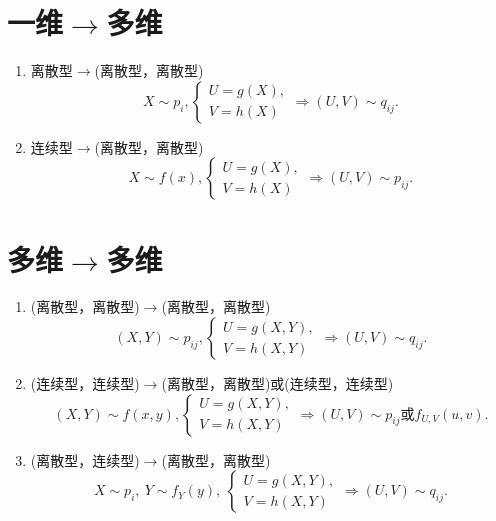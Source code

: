 \section{一维$\rightarrow$多维}
\begin{enumerate}
    \item 离散型$\rightarrow$(离散型，离散型)
          $$X\sim p_i,\begin{cases}U=g(X),\\V=h(X)\end{cases}\Rightarrow(U,V)\sim q_{ij}.$$
    \item 连续型$\rightarrow$(离散型，离散型)
          $$X\sim f(x),\begin{cases}U=g(X),\\V=h(X)\end{cases}\Rightarrow(U,V)\sim p_{ij}.$$
\end{enumerate}
\section{多维$\rightarrow$多维}

\begin{enumerate}
    \item (离散型，离散型)$\rightarrow$(离散型，离散型)
          $$(X,Y)\sim p_{ij},\begin{cases}U=g(X,Y),\\V=h(X,Y)\end{cases}\Rightarrow(U,V)\sim q_{ij}.$$
    \item (连续型，连续型)$\rightarrow$(离散型，离散型)或(连续型，连续型)
          $$(X,Y)\sim f(x,y),\begin{cases}U=g(X,Y),\\V=h(X,Y)\end{cases}\Rightarrow(U,V)\sim p_{ij}\text{或}f_{U,V}(u,v).$$
    \item (离散型，连续型)$\rightarrow$(离散型，离散型)
          $$X\sim p_i,\:Y\sim f_Y(y),\:\begin{cases}U=g(X,Y),\\V=h(X,Y)\end{cases}\Rightarrow(U,V)\sim q_{ij}.$$
\end{enumerate}
